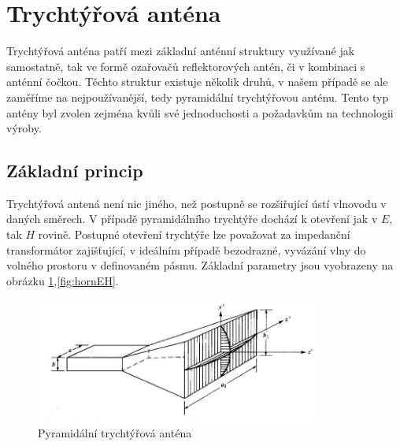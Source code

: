 \section{Trychtýřová anténa}
Trychtýřová anténa patří mezi základní anténní struktury využívané jak samostatně, tak ve formě ozařovačů reflektorových antén, či v kombinaci s anténní čočkou. Těchto struktur existuje několik druhů, v našem případě se ale zaměříme na nejpoužívanější, tedy pyramidální trychtýřovou anténu.
Tento typ antény byl zvolen zejména kvůli své jednoduchosti a požadavkům na technologii výroby.

\subsection{Základní princip}
Trychtýřová antená není nic jiného, než postupně se rozšiřující ústí vlnovodu v daných směrech. V případě pyramidálního trychtýře dochází k otevření jak v $E$, tak $H$ rovině. Postupné otevření trychtýře lze považovat za impedanční transformátor zajišťující, v ideálním případě bezodrazné, vyvázání vlny do volného prostoru v definovaném pásmu.
Základní parametry jsou vyobrazeny na obrázku \ref{fig:horn},\ref{fig:hornEH}.

\begin{figure}[h]
\begin{center}
\includegraphics[width=9.5cm]{pics/horn}
\caption{Pyramidální trychtýřová anténa}
\label{fig:horn}
\end{center}
\end{figure}

